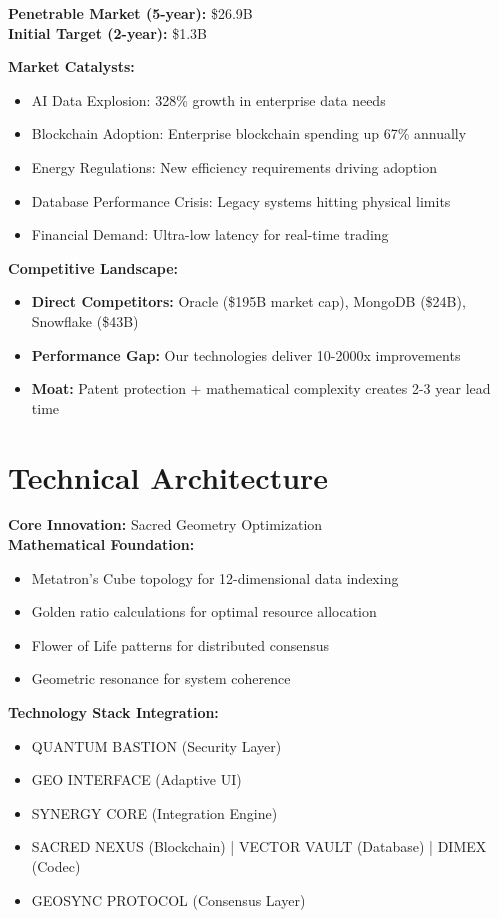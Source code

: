 \documentclass{article}
\begin{document}
\textbf{Penetrable Market (5-year):} \$26.9B \\
\textbf{Initial Target (2-year):} \$1.3B

\textbf{Market Catalysts:}
\begin{itemize}
    \item AI Data Explosion: 328\% growth in enterprise data needs
    \item Blockchain Adoption: Enterprise blockchain spending up 67\% annually
    \item Energy Regulations: New efficiency requirements driving adoption
    \item Database Performance Crisis: Legacy systems hitting physical limits
    \item Financial Demand: Ultra-low latency for real-time trading
\end{itemize}

\textbf{Competitive Landscape:}
\begin{itemize}
    \item \textbf{Direct Competitors:} Oracle (\$195B market cap), MongoDB (\$24B), Snowflake (\$43B)
    \item \textbf{Performance Gap:} Our technologies deliver 10-2000x improvements
    \item \textbf{Moat:} Patent protection + mathematical complexity creates 2-3 year lead time
\end{itemize}

\section{Technical Architecture}
\textbf{Core Innovation:} Sacred Geometry Optimization \\
\textbf{Mathematical Foundation:}
\begin{itemize}
    \item Metatron's Cube topology for 12-dimensional data indexing
    \item Golden ratio calculations for optimal resource allocation
    \item Flower of Life patterns for distributed consensus
    \item Geometric resonance for system coherence
\end{itemize}

\textbf{Technology Stack Integration:}
\begin{itemize}
    \item QUANTUM BASTION (Security Layer)
    \item GEO INTERFACE (Adaptive UI)
    \item SYNERGY CORE (Integration Engine)
    \item SACRED NEXUS (Blockchain) | VECTOR VAULT (Database) | DIMEX (Codec)
    \item GEOSYNC PROTOCOL (Consensus Layer)
\end{itemize}
\end{document}
